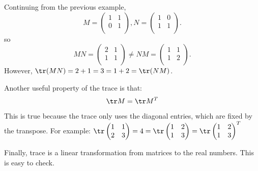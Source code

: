 \begin{example}
Continuing from the previous example, 
\[
M= \begin{pmatrix}
1 & 1 \\
0 & 1 \\
\end{pmatrix}, N=
\begin{pmatrix}
1 & 0 \\
1 & 1 \\
\end{pmatrix}.
\]
so
\[
MN = \begin{pmatrix}
2 & 1 \\
1 & 1 \\
\end{pmatrix} \neq
NM = \begin{pmatrix}
1 & 1 \\
1 & 2 \\
\end{pmatrix}.
\]
However, $\tr(MN) = 2+1 = 3 = 1+2 = \tr(NM)$.
\end{example}

Another useful property of the trace is that:
\[\tr M = \tr M^T\] 
This is true because the trace only uses the diagonal entries, which are fixed by the transpose.  For example:
$\tr \begin{pmatrix}
1 & 1 \\
2 & 3 \\
\end{pmatrix} = 4 = \tr \begin{pmatrix}
1 & 2 \\
1 & 3 \\
\end{pmatrix} = \tr \begin{pmatrix}
1 & 2 \\
1 & 3 \\
\end{pmatrix}^T
$

Finally, trace is a linear transformation from matrices to the real numbers.  This is easy to check.



